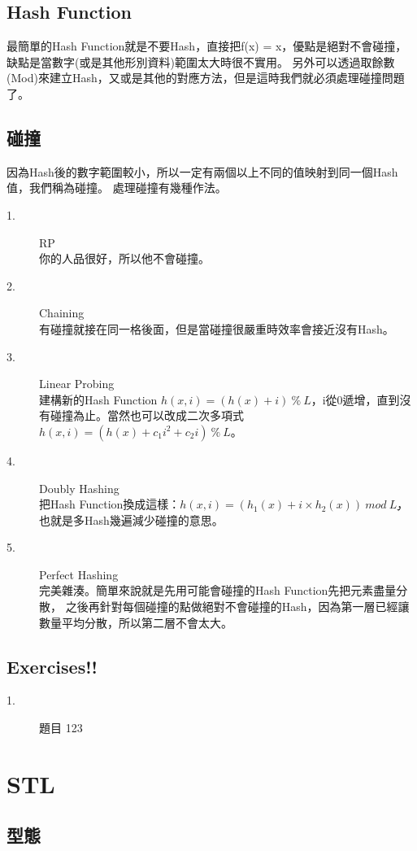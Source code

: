 \documentclass{article}
\begin{document}
\subsection{Hash Function}
最簡單的Hash Function就是不要Hash，直接把f(x) = x，優點是絕對不會碰撞，
缺點是當數字(或是其他形別資料)範圍太大時很不實用。
另外可以透過取餘數(Mod)來建立Hash，又或是其他的對應方法，但是這時我們就必須處理碰撞問題了。

\subsection{碰撞}
因為Hash後的數字範圍較小，所以一定有兩個以上不同的值映射到同一個Hash值，我們稱為碰撞。
處理碰撞有幾種作法。
\begin{description}
\item[ 1.]RP\\
你的人品很好，所以他不會碰撞。
\item[ 2.]Chaining\\
有碰撞就接在同一格後面，但是當碰撞很嚴重時效率會接近沒有Hash。
\item[ 3.]Linear Probing\\
建構新的Hash Function $h(x, i) = (h(x) + i)\ \%\ L$，i從0遞增，直到沒有碰撞為止。當然也可以改成二次多項式$h(x, i) = (h(x) + c_1 i^2 + c_2 i)\ \%\ L$。
\item[ 4.]Doubly Hashing\\
把Hash Function換成這樣：$ h(x, i) = (h_1 (x) + i × h_2 (x))\ mod\ Lׇ$，也就是多Hash幾遍減少碰撞的意思。

\item[ 5.]Perfect Hashing\\
完美雜湊。簡單來說就是先用可能會碰撞的Hash Function先把元素盡量分散，
之後再針對每個碰撞的點做絕對不會碰撞的Hash，因為第一層已經讓數量平均分散，所以第二層不會太大。
\end{description}

\subsection{Exercises!!}
\begin{description}
\item[ 1.]題目
123
\end{description}

\section{STL}

\subsection{型態}
\end{document}
